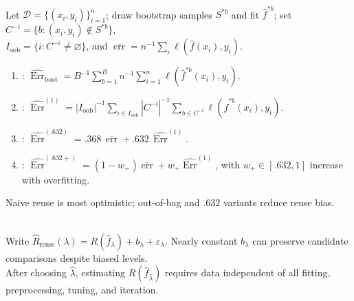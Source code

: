 \begin{method} \label{meth:sl-bootstrap-prediction-error} \\
Let $\mathcal{D}=\{(x_i,y_i)\}_{i=1}^n$; draw bootstrap samples $S^{\ast b}$ and fit $\widehat f^{\ast b}$; set $C^{-i}=\{b:(x_i,y_i)\notin S^{\ast b}\}$,\\
$I_{\mathrm{oob}}=\{i:C^{-i}\ne\varnothing\}$, and $\overline{\operatorname{err}}=n^{-1}\sum_i\ell(\widehat f(x_i),y_i)$.
\begin{enumerate}[label=(\roman*)]
\setlength{\itemsep}{0pt}
\item {}: $\widehat{\operatorname{Err}}_{\mathrm{boot}}=B^{-1}\sum_{b=1}^B n^{-1}\sum_{i=1}^n\ell(\widehat f^{\ast b}(x_i),y_i)$.
\item {}: $\widehat{\operatorname{Err}}^{(1)}=|I_{\mathrm{oob}}|^{-1}\sum_{i\in I_{\mathrm{oob}}}|C^{-i}|^{-1}\sum_{b\in C^{-i}}\ell(\widehat f^{\ast b}(x_i),y_i)$.
\item {}: $\widehat{\operatorname{Err}}^{(.632)}=.368\,\overline{\operatorname{err}}+.632\,\widehat{\operatorname{Err}}^{(1)}$.
\item {}: $\widehat{\operatorname{Err}}^{(.632+)}=(1-w_+)\overline{\operatorname{err}}+w_+\widehat{\operatorname{Err}}^{(1)}$, with $w_+\in[.632,1]$ increase with overfitting.
\end{enumerate}
Naive reuse is most optimistic; out-of-bag and $.632$ variants reduce reuse bias.
\end{method}

\begin{remark} \label{rem:sl-resampling-limits} \\
Write $\widehat R_{\mathrm{reuse}}(\lambda)=R(\widehat f_\lambda)+b_\lambda+\varepsilon_\lambda$. Nearly constant $b_\lambda$ can preserve candidate comparisons despite biased levels.\\
After choosing $\widehat\lambda$, estimating $R(\widehat f_{\widehat\lambda})$ requires data independent of all fitting, preprocessing, tuning, and iteration.
\end{remark}
